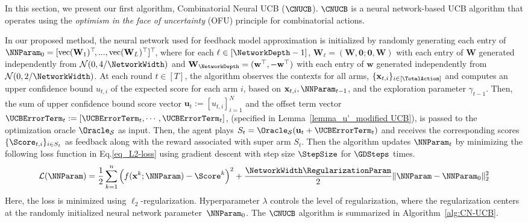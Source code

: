 \documentclass{article}
\theoremstyle{plain}
\begin{document}
In this section, we present our first algorithm, Combinatorial Neural UCB ($\CNUCB$). $\CNUCB$ is a neural network-based UCB algorithm that operates using the {\it optimism in the face of uncertainty} (OFU) principle \cite{lai1985asymptotically} for combinatorial actions. 

In our proposed method, the neural network used for feedback model approximation is initialized by randomly generating each entry of $\NNParam_0 = [ \text{vec}(\mathbf{W}_1)^\top\!, ...,\text{vec}(\mathbf{W}_L)^\top ]^\top\!$, where for each $\ell \in [\NetworkDepth-1]$, $\mathbf{W}_\ell = (\mathbf{W}, \mathbf{0}; \mathbf{0}, \mathbf{W})$ with
each entry of $\mathbf{W}$ generated independently from $\mathcal{N}(0, 4/\NetworkWidth)$ 
and $\mathbf{W}_{\NetworkDepth} = (\mathbf{w}^\top, -\mathbf{w}^\top)$ with each entry of $\mathbf{w}$ generated independently from $\mathcal{N}(0, 2/\NetworkWidth)$. 
At each round $t \in [T]$, the algorithm observes the contexts for all arms, $\{ \mathbf{x}_{t, i} \}_{i \in [\TotalAction]}$ and computes an upper confidence bound $u_{t, i}$ of the expected score for each arm $i$, 
based on $\mathbf{x}_{t,i}, \NNParam_{t-1}$, and the exploration parameter $\gamma_{t-1}$.
%
%
Then, the sum of upper confidence bound score vector $\mathbf{u}_t := \left[ u_{t,i}\right]_{i=1}^{N}$ and the offset term vector $\mathbf{\UCBErrorTerm}_t := [\UCBErrorTerm_t, \cdots, \UCBErrorTerm_t]$,
(specified in Lemma~\ref{lemma_u'_modified UCB}),
is passed to the optimization oracle $\Oracle_{\mathcal{S}}$ as input. Then, the agent plays  $S_t = \Oracle_{\mathcal{S}}(\mathbf{u}_t + \mathbf{\UCBErrorTerm}_t)$ and receives the corresponding scores $\{ \Score_{t,i} \}_{i \in S_t}$ as feedback along with the reward associated with super arm $S_t$. 
Then the algorithm updates $\NNParam_{t}$ by minimizing the following loss function in Eq.\eqref{eq_L2-loss} using gradient descent with step size $\StepSize$ for $\GDSteps$ times.
%
\begin{equation}
\label{eq_L2-loss}
    \mathcal{L}(\NNParam) = \frac{1}{2}\sum_{k=1}^{n} \left( f(\mathbf{x}^k;\NNParam) - \Score^k \right)^2 + \frac{\NetworkWidth \RegularizationParam}{2} \|\NNParam - \NNParam_0 \|_2^2
\end{equation}
%
Here, the loss is minimized using $\ell_2$-regularization. Hyperparameter $\lambda$ controls the level of regularization, where the regularization centers at the randomly initialized neural network parameter~$\NNParam_0$.
The $\CNUCB$ algorithm is summarized in Algorithm~\ref{alg:CN-UCB}.
\end{document}
